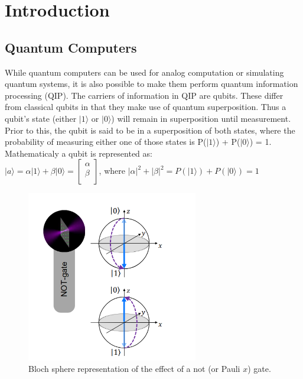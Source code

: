 \section{Introduction}
\label{sec:intro}


\subsection{Quantum Computers}
\label{sec:QC}
While quantum computers can be used for analog computation or simulating quantum systems\cite{henrietQuantumComputingNeutral2020}, 
it is also possible to make them perform quantum information processing (QIP). The carriers of information in QIP are qubits. These differ from classical qubits
in that they make use of quantum superposition. Thus a qubit's state (either $|1 \rangle$ or $|0 \rangle$) will remain in superposition until measurement. Prior to this,
the qubit is said to be in a superposition of both states, where the probability of measuring either one of those states is P($|1 \rangle$) + P($|0 \rangle$) = 1\cite{wongIntroductionClassicalQuantum2022a}.
Mathematicaly a qubit is represented as:\\
$ |a \rangle = \alpha|1 \rangle + \beta|0 \rangle =  \begin{bmatrix}
    \alpha \\
    \beta \\
\end{bmatrix}$, where $|\alpha|^2 + |\beta|^2 = P(|1 \rangle) + P(|0 \rangle) = 1$

\begin{figure}
  \centering
  \includegraphics[width=75mm]{./Images/BlochNotGate.png}
  \caption{Bloch sphere representation of the effect of a not (or Pauli $x$) gate. \cite{henrietQuantumComputingNeutral2020}} 
  \label{fig:BlockNotGate}

\end{figure}


